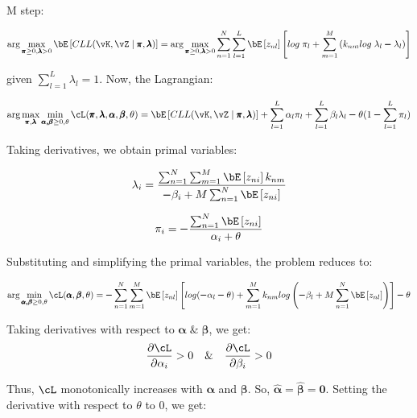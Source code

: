 \documentclass[a4paper,12pt]{article}
\begin{document}
\begin{mlsolution}
M step:

\begin{equation*}
    \text{arg}\max\limits_{\pmb{\pi}\geq 0, \pmb{\lambda}>0}\bE\bs{CLL(\vK, \vZ \;|\;\pmb{\pi}, \pmb{\lambda})} = \text{arg}\max\limits_{\pmb{\pi}\geq 0, \pmb{\lambda}>0}\sum\limits_{n=1}^N\sum\limits_{l=1}^L\bE\bs{z_{nl}}\bs{log\;\pi_l + \sum\limits_{m=1}^M\br{k_{nm}log\;\lambda_l \pmb{-} \lambda_l}}
\end{equation*}

given $\sum\limits_{l=1}^L\lambda_l =1$. Now, the Lagrangian:

\begin{equation*}
    \text{arg}\max\limits_{\pmb{\pi}, \pmb{\lambda}}\min\limits_{\pmb{\alpha ,\beta}\geq 0, \theta} \cL(\pmb{\pi}, \pmb{\lambda}, \pmb{\alpha}, \pmb{\beta}, \theta) = \bE\bs{CLL(\vK, \vZ \;|\;\pmb{\pi}, \pmb{\lambda})} + \sum\limits_{l=1}^L \alpha_l\pi_l + \sum\limits_{l=1}^L\beta_l\lambda_l \pmb{-} \theta(1\pmb{-}\sum_{l=1}^L \pi_l)
\end{equation*}

Taking derivatives, we obtain primal variables:

\begin{equation*}
    \lambda_i = \frac{\sum_{n=1}^N\sum_{m=1}^M\bE\bs{z_{ni}}k_{nm}}{\pmb{-}\beta_i + M\sum_{n=1}^N\bE\bs{z_{ni}}}
\end{equation*}

\begin{equation*}
    \pi_i = \pmb{-} \frac{\sum_{n=1}^N\bE\bs{z_{ni}}}{\alpha_i+\theta}
\end{equation*}

Substituting and simplifying the primal variables, the problem reduces to:

\begin{equation*}
    \text{arg}\min\limits_{\pmb{\alpha ,\beta}\geq 0, \theta}\cL(\pmb{\alpha}, \pmb{\beta}, \theta) = \pmb{-} \sum\limits_{n=1}^N\sum\limits_{m=1}^M \bE\bs{z_{nl}} \bs{log(\pmb{-}\alpha_l\pmb{-}\theta) + \sum_{m=1}^M k_{nm} log\br{\pmb{-}\beta_l + M\sum\limits_{n=1}^N\bE\bs{z_{nl}}}} \pmb{-} \theta
\end{equation*}

Taking derivatives with respect to $\pmb{\alpha}\;\&\;\pmb{\beta}$, we get:
\begin{equation*}
    \frac{\partial\cL}{\partial\alpha_i}>0\quad\&\quad\frac{\partial\cL}{\partial\beta_i}>0    
\end{equation*}

Thus, $\cL$ monotonically increases with $\pmb{\alpha}$ and $\pmb{\beta}$. So, $\hat{\pmb{\alpha}}=\hat{\pmb{\beta}}=\pmb{0}$. Setting the derivative with respect to $\theta$ to $0$, we get:


\end{mlsolution}
\end{document}
